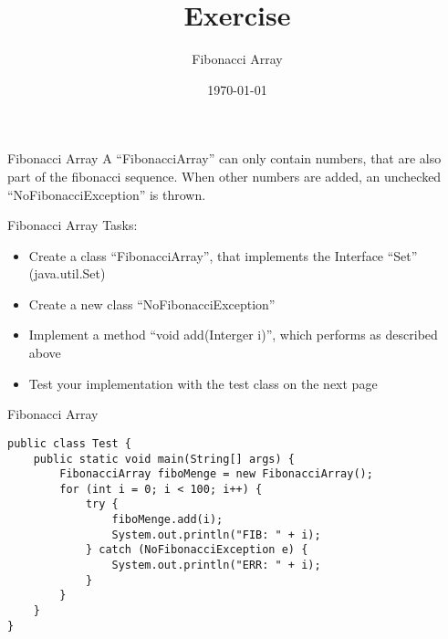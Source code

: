 


\title{Exercise}
\subtitle{Fibonacci Array}
\date{\today}




\begin{frame}
    \titlepage
\end{frame}

\begin{frame}[fragile]{Fibonacci Array}
    A ``FibonacciArray'' can only contain numbers, that are also part of the fibonacci sequence. When other numbers are added, an unchecked ``NoFibonacciException'' is thrown.
\end{frame}

\begin{frame}{Fibonacci Array}
    Tasks:
    \begin{itemize}
        \item Create a class ``FibonacciArray'', that implements the Interface ``Set'' (java.util.Set)
        \item Create a new class ``NoFibonacciException''
        \item Implement a method ``void add(Interger i)'', which performs as described above
        \item Test your implementation with the test class on the next page
    \end{itemize}
\end{frame}

\begin{frame}[fragile]{Fibonacci Array}
   \begin{lstlisting}
public class Test {
    public static void main(String[] args) {
        FibonacciArray fiboMenge = new FibonacciArray();
        for (int i = 0; i < 100; i++) { 
            try {
                fiboMenge.add(i);
                System.out.println("FIB: " + i);
            } catch (NoFibonacciException e) {
                System.out.println("ERR: " + i);
            } 
        }
    } 
}\end{lstlisting}
\end{frame}



